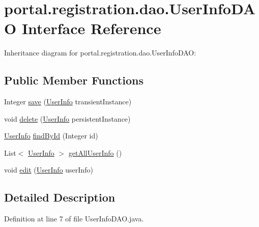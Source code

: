 \hypertarget{interfaceportal_1_1registration_1_1dao_1_1UserInfoDAO}{
\section{portal.registration.dao.UserInfoDAO Interface Reference}
\label{interfaceportal_1_1registration_1_1dao_1_1UserInfoDAO}
}


Inheritance diagram for portal.registration.dao.UserInfoDAO:
\subsection*{Public Member Functions}
\begin{DoxyCompactItemize}
\item 
Integer \hyperlink{interfaceportal_1_1registration_1_1dao_1_1UserInfoDAO_ab4af4547afb3bd184da2de4bfefdc47b}{save} (\hyperlink{classportal_1_1registration_1_1domain_1_1UserInfo}{UserInfo} transientInstance)
\item 
void \hyperlink{interfaceportal_1_1registration_1_1dao_1_1UserInfoDAO_a06a993e6dc5cfa6e0ea1e6e89236172f}{delete} (\hyperlink{classportal_1_1registration_1_1domain_1_1UserInfo}{UserInfo} persistentInstance)
\item 
\hyperlink{classportal_1_1registration_1_1domain_1_1UserInfo}{UserInfo} \hyperlink{interfaceportal_1_1registration_1_1dao_1_1UserInfoDAO_a6ae6399cb2791e189e16ab3633df360e}{findById} (Integer id)
\item 
List$<$ \hyperlink{classportal_1_1registration_1_1domain_1_1UserInfo}{UserInfo} $>$ \hyperlink{interfaceportal_1_1registration_1_1dao_1_1UserInfoDAO_a6645e9b35b21d5ccd5f3f5baea8a5b27}{getAllUserInfo} ()
\item 
void \hyperlink{interfaceportal_1_1registration_1_1dao_1_1UserInfoDAO_a498f8f18418dfe7969424259454efb71}{edit} (\hyperlink{classportal_1_1registration_1_1domain_1_1UserInfo}{UserInfo} userInfo)
\end{DoxyCompactItemize}


\subsection{Detailed Description}


Definition at line 7 of file UserInfoDAO.java.



